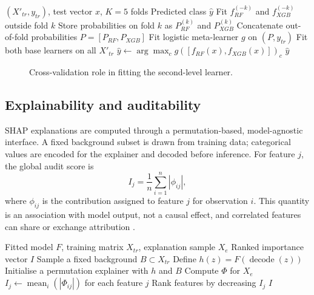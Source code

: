 ﻿\documentclass[preprint,12pt]{elsarticle}
\begin{document}
\begin{algorithm}[t]
\caption{Out-of-fold stacking prediction}
\label{alg:stack}
\begin{algorithmic}[1]
\Require $(X'_{tr},y_{tr})$, test vector $x$, $K=5$ folds
\Ensure Predicted class $\hat y$
\State Fit $f_{RF}^{(-k)}$ and $f_{XGB}^{(-k)}$ outside fold $k$
\State Store probabilities on fold $k$ as $P_{RF}^{(k)}$ and $P_{XGB}^{(k)}$
\EndFor
\State Concatenate out-of-fold probabilities $P=[P_{RF},P_{XGB}]$
\State Fit logistic meta-learner $g$ on $(P,y_{tr})$
\State Fit both base learners on all $X'_{tr}$
\State $\hat y\gets\arg\max_c g([f_{RF}(x),f_{XGB}(x)])_c$
\State \Return $\hat y$
\end{algorithmic}
\end{algorithm}

\begin{figure}[t]
\centering
{}
\caption{Cross-validation role in fitting the second-level learner.}
\label{fig:oof}
\end{figure}

\subsection{Explainability and auditability}
SHAP explanations are computed through a permutation-based, model-agnostic interface. A fixed background subset is drawn from training data; categorical values are encoded for the explainer and decoded before inference. For feature $j$, the global audit score is
\begin{equation}
I_j=\frac{1}{n}\sum_{i=1}^{n}|\phi_{ij}|,
\end{equation}
where $\phi_{ij}$ is the contribution assigned to feature $j$ for observation $i$. This quantity is an association with model output, not a causal effect, and correlated features can share or exchange attribution \cite{arrieta2020,lundberg2020,ar2023}.

\begin{algorithm}[t]
\caption{Permutation-SHAP model audit}
\label{alg:shap}
\begin{algorithmic}[1]
\Require Fitted model $F$, training matrix $X_{tr}$, explanation sample $X_e$
\Ensure Ranked importance vector $I$
\State Sample a fixed background $B\subset X_{tr}$
\State Define $h(z)=F(\operatorname{decode}(z))$
\State Initialise a permutation explainer with $h$ and $B$
\State Compute $\Phi$ for $X_e$
\State $I_j\gets\operatorname{mean}_i(|\Phi_{ij}|)$ for each feature $j$
\State Rank features by decreasing $I_j$
\State \Return $I$
\end{algorithmic}
\end{algorithm}
\end{document}
